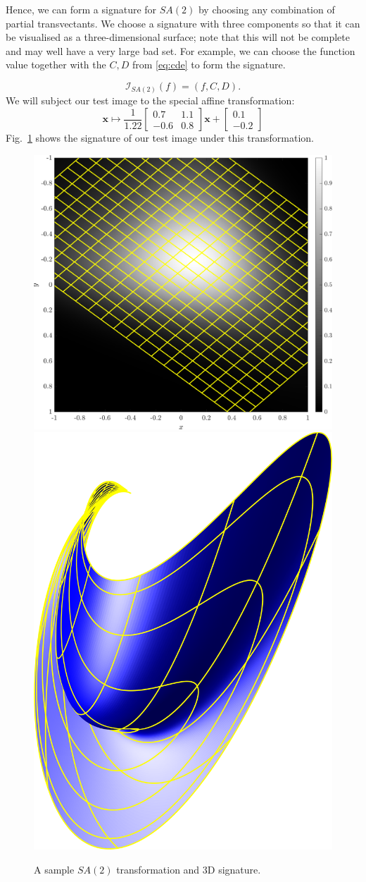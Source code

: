 \documentclass[review,onefignum,onetabnum]{siamonline190516}
\begin{document}
Hence, we can form a signature for $SA(2)$ by choosing any combination of
partial transvectants. We choose a signature with three components so that
it can be visualised as a three-dimensional surface; note that this will
not be complete and may well have a very large bad set. For example, we can
choose the function value together with the $C, D$ from \eqref{eq:cde}
to form the signature. 

\begin{equation}
    \label{eq:SA2signature}
    \mathcal{I}_{SA(2)}(f) = \left(f, C, D \right).
\end{equation}
We will subject our test image to the special affine transformation:
\begin{equation*}
\mathbf{x} \mapsto \frac{1}{1.22}\begin{bmatrix} 0.7 & 1.1 \\ -0.6 & 0.8 \end{bmatrix}\mathbf{x} + \begin{bmatrix} 0.1 \\ -0.2 \end{bmatrix}
\end{equation*}
Fig.~\ref{fig:SA2} shows the signature of our test image under this transformation.

\begin{figure}
\centering
\includegraphics[width=.45\textwidth]{Figs/f_transformed_SA2.png}
\includegraphics[width=.45\textwidth]{Figs/SA2_signature.png}
\caption{A sample $SA(2)$ transformation and 3D signature.}
\label{fig:SA2}
\end{figure}
\end{document}
